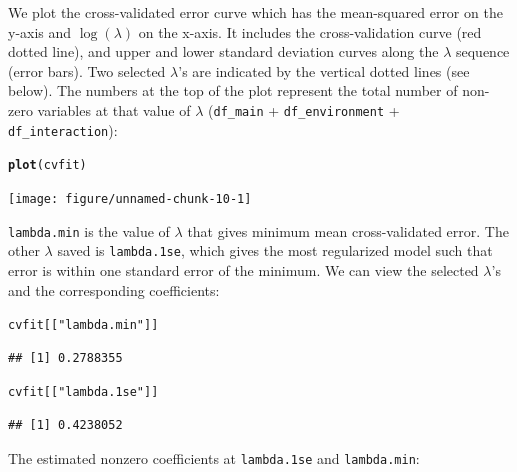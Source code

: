 \documentclass[12pt,letter]{article}\usepackage[]{graphicx}\usepackage[]{color}
\makeatletter
\newcommand{\hlstr}[1]{\textcolor[rgb]{0.192,0.494,0.8}{#1}}%
\newcommand{\hlstd}[1]{\textcolor[rgb]{0.345,0.345,0.345}{#1}}%
\newcommand{\hlkwd}[1]{\textcolor[rgb]{0.737,0.353,0.396}{\textbf{#1}}}%
\newenvironment{kframe}{%
 \def\at@end@of@kframe{}%
 \ifinner\ifhmode%
  \def\at@end@of@kframe{\end{minipage}}%
  \begin{minipage}{\columnwidth}%
 \fi\fi%
 \def\FrameCommand##1{\hskip\@totalleftmargin \hskip-\fboxsep
 \colorbox{shadecolor}{##1}\hskip-\fboxsep
     \hskip-\linewidth \hskip-\@totalleftmargin \hskip\columnwidth}%
 \MakeFramed {\advance\hsize-\width
   \@totalleftmargin\z@ \linewidth\hsize
   \@setminipage}}%
 {\par\unskip\endMakeFramed%
 \at@end@of@kframe}
\newenvironment{knitrout}{}{} %
\makeatother
\begin{document}
We plot the cross-validated error curve which has the mean-squared error on the y-axis and $\log(\lambda)$ on the x-axis. It includes the cross-validation curve (red dotted line), and upper and lower standard deviation curves along the $\lambda$ sequence (error bars). Two selected $\lambda$'s are indicated by the vertical dotted lines (see below). The numbers at the top of the plot represent the total number of non-zero variables at that value of $\lambda$ (\texttt{df\_main} + \texttt{df\_environment} + \texttt{df\_interaction}):


\begin{knitrout}\scriptsize
{}\color{fgcolor}\begin{kframe}
\begin{alltt}
\hlkwd{plot}\hlstd{(cvfit)}
\end{alltt}
\end{kframe}

{\centering \texttt{[image: figure/unnamed-chunk-10-1]} 

}



\end{knitrout}

\texttt{lambda.min} is the value of $\lambda$ that gives minimum mean cross-validated error. The other $\lambda$ saved is \texttt{lambda.1se},
which gives the most regularized model such that error is within one standard error of the minimum. We can view the selected $\lambda$'s and the corresponding coefficients:

\begin{knitrout}\scriptsize
{}\color{fgcolor}\begin{kframe}
\begin{alltt}
\hlstd{cvfit[[}\hlstr{"lambda.min"}\hlstd{]]}
\end{alltt}
\begin{verbatim}
## [1] 0.2788355
\end{verbatim}
\begin{alltt}
\hlstd{cvfit[[}\hlstr{"lambda.1se"}\hlstd{]]}
\end{alltt}
\begin{verbatim}
## [1] 0.4238052
\end{verbatim}
\end{kframe}
\end{knitrout}

The estimated nonzero coefficients at \texttt{lambda.1se} and \texttt{lambda.min}:
\end{document}
